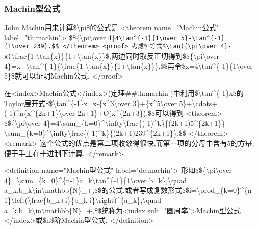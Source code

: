 \documentclass[
]{article}
\begin{document}
\hypertarget{machinux578bux516cux5f0f}{%
\subsubsection{Machin型公式}\label{machinux578bux516cux5f0f}}

John Machin用来计算\$\textbackslash pi\$的公式是 \textless theorem
name="Machin公式" label="th:machin"\textgreater{}
\$\$\{\textbackslash pi\textbackslash over
4\}\texttt{4\textbackslash{}tan\^{}\{-1\}\{1\textbackslash{}over\ 5\}-\textbackslash{}tan\^{}\{-1\}\{1\textbackslash{}over\ 239\}.\$\$
\textless{}/theorem\textgreater{}
\textless{}proof\textgreater{}
考虑恒等式\$\textbackslash{}tan(\{\textbackslash{}pi\textbackslash{}over\ 4\}-x)}\textbackslash frac\{1-\textbackslash tan\{x\}\}\{1+\textbackslash tan\{x\}\}\$,两边同时取反正切得到\$\$\{\textbackslash pi\textbackslash over
4\}=x+\textbackslash tan\^{}\{-1\}\{\textbackslash frac\{1-\textbackslash tan\{x\}\}\{1+\textbackslash tan\{x\}\}\},\$\$再令\$x=4\textbackslash tan\^{}\{-1\}\{1\textbackslash over
5\}\$就可以证明Machin公式. \textless/proof\textgreater{}

在\textless index\textgreater Machin公式\textless/index\textgreater(定理\#\#th:machin
)中利用\$\textbackslash tan\^{}\{-1\}x\$的Taylor展开式\$\$\textbackslash tan\^{}\{-1\}x=x-\{x\^{}3\textbackslash over
3\}+\{x\^{}5\textbackslash over
5\}+\textbackslash cdots+(-1)\^{}n\{x\^{}\{2n+1\}\textbackslash over
2n+1\}+O(x\^{}\{2n+3\}),\$\$可以得到 \textless theorem\textgreater{}
\$\$\{\textbackslash pi\textbackslash over
4\}=4\textbackslash sum\_\{k=0\}\^{}\textbackslash infty\textbackslash frac\{(-1)\^{}k\}\{(2k+1)5\^{}\{2k+1\}\}-\textbackslash sum\_\{k=0\}\^{}\textbackslash infty\textbackslash frac\{(-1)\^{}k\}\{(2k+1)239\^{}\{2k+1\}\}.\$\$
\textless/theorem\textgreater{} \textless remark\textgreater{}
这个公式的优点是第二项收敛得很快,而第一项的分母中含有5的方幂,便于手工在十进制下计算.
\textless/remark\textgreater{}

\textless definition name="Machin型公式" label="de:machin"\textgreater{}
形如\$\$\{\textbackslash pi\textbackslash over
4\}=\textbackslash sum\_\{k=0\}\^{}\{n-1\}a\_k\textbackslash tan\^{}\{-1\}\{1\textbackslash over
b\_k\},\textbackslash quad
a\_k,b\_k\textbackslash in\textbackslash mathbb\{N\}\_+,\$\$的公式,或者写成复数形式\$\$i=\textbackslash prod\_\{k=0\}\^{}\{n-1\}\textbackslash left(\textbackslash frac\{b\_k+i\}\{b\_k-i\}\textbackslash right)\^{}\{a\_k\},\textbackslash quad
a\_k,b\_k\textbackslash in\textbackslash mathbb\{N\}\_+,\$\$统称为\textless index
sub="圆周率"\textgreater Machin型公式\textless/index\textgreater 或\$n\$阶Machin型公式.
\textless/definition\textgreater{}
\end{document}
